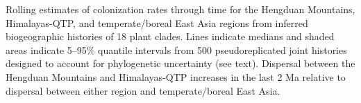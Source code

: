 \label{fig:dispersal}
Rolling estimates of colonization rates through time for the Hengduan Mountains, Himalayas-QTP, and temperate/boreal East Asia regions from inferred biogeographic histories of 18 plant clades. Lines indicate medians and shaded areas indicate 5–95\% quantile intervals from 500 pseudoreplicated joint histories designed to account for phylogenetic uncertainty (see text). Dispersal between the Hengduan Mountains and Himalayas-QTP increases in the last 2 Ma relative to dispersal between either region and temperate/boreal East Asia.